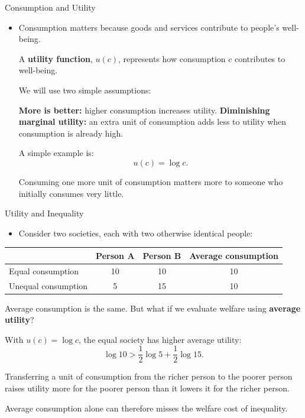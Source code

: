\documentclass[10pt,aspectratio=169]{beamer}
\begin{document}
\begin{frame}{Consumption and Utility}

\begin{itemize}
    \item Consumption matters because goods and services contribute to people's well-being.

    \itemvso A \textbf{utility function}, \(u(c)\), represents how consumption \(c\) contributes to well-being.

    \itemvso We will use two simple assumptions:
    \begin{itemize}
        \itemvso \textbf{More is better:} higher consumption increases utility.
        \itemvso \textbf{Diminishing marginal utility:} an extra unit of consumption adds less to utility when consumption is already high.
    \end{itemize}

    \itemvso A simple example is:
    \[
        u(c) = \log c.
    \]

    \itemvso Consuming one more unit of consumption matters more to someone who initially consumes very little.
\end{itemize}

\end{frame}

\begin{frame}{Utility and Inequality}

\begin{itemize}
    \item Consider two societies, each with two otherwise identical people:
\end{itemize}

\begin{center}
\begin{tabular}{lccc}
\hline
 & Person A & Person B & Average consumption \\
\hline
Equal consumption   & 10 & 10 & 10 \\
Unequal consumption & 5  & 15 & 10 \\
\hline
\end{tabular}
\end{center}

\begin{itemize}
    \itemvso Average consumption is the same. But what if we evaluate welfare using \textbf{average utility}?

    \itemvso With \(u(c)=\log c\), the equal society has higher average utility:
    \[
        \log 10
        >
        \frac{1}{2}\log 5 + \frac{1}{2}\log 15.
    \]

    \itemvso Transferring a unit of consumption from the richer person to the poorer person raises utility more for the poorer person than it lowers it for the richer person.

    \itemvso Average consumption alone can therefore misses the welfare cost of inequality.
\end{itemize}

\end{frame}
\end{document}
